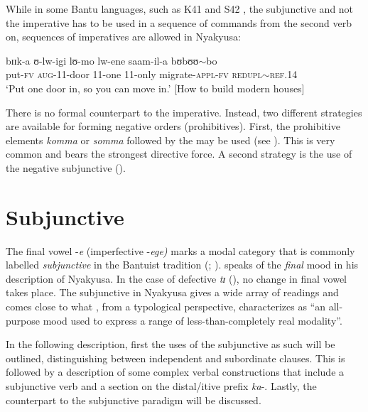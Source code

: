 While in some Bantu languages, such as  K41 \citep{SeidelF2008} and  S42 \citep{ZiervogelDLouwJATaljaardP1981}, the subjunctive and not the imperative has to be used in a sequence of commands from the second verb on, sequences of imperatives are allowed in Nyakyusa:
\begin{exe}
\ex 
\gll bɪɪk-a ʊ-lw-igi lʊ-mo lw-ene saam-il-a bʊbʊʊ$\sim$bo\\
put-\textsc{fv} \textsc{aug}-11-door 11-one 11-only migrate-\textsc{appl}-\textsc{fv} \textsc{redupl}$\sim$\textsc{ref.14}\\
\glt `‎‎Put one door in, so you can move in.' [How to build modern houses]\label{exSeriesImperatives}
\end{exe}

There is no formal  counterpart to the imperative. Instead, two different strategies are available for forming negative orders (prohibitives). First, the prohibitive elements \textit{komma} or \textit{somma} followed by the  may be used (see ). This is very common and bears the strongest directive force. A second strategy is the use of the negative subjunctive ().
\section{Subjunctive}\label{Subjunctive} 
The final vowel -\textit{e} (imperfective -\textit{ege)} marks a modal category that is commonly labelled \textit{subjunctive} in the Bantuist tradition (\citealt[203f]{DokeC1935}; \citealt[83f]{RoseEtal2002}). \citet[62f]{EndemannC1914} speaks of the \textit{final} mood in his description of Nyakyusa. In the case of defective \textit{tɪ} (), no change in final vowel takes place. The subjunctive in Nyakyusa gives a wide array of readings and comes close to what \citet[326]{TimberlakeA2007}, from a typological perspective, characterizes as ``an all-purpose mood used to express a range of less-than-completely real modality''.

In the following description, first the uses of the subjunctive as such will be outlined, distinguishing between independent and subordinate clauses. This is followed by a description of some complex verbal constructions that include a subjunctive verb and a section on the distal/itive prefix \textit{ka}-. Lastly, the  counterpart to the subjunctive paradigm will be discussed. 
